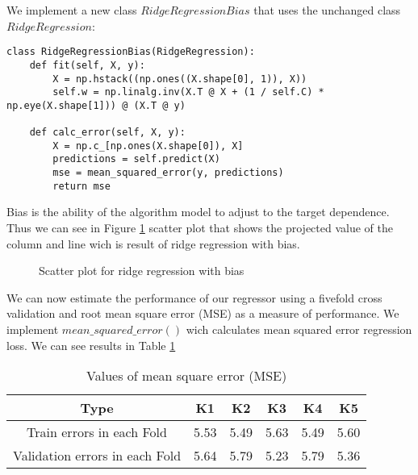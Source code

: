 \documentclass[a4paper, twoside, english]{article}
\begin{document}
\newpage
We implement a new class $RidgeRegressionBias$ that uses the unchanged class $RidgeRegression$:\\
\begin{lstlisting}[language=iPython]
class RidgeRegressionBias(RidgeRegression):
	def fit(self, X, y):
		X = np.hstack((np.ones((X.shape[0], 1)), X))
		self.w = np.linalg.inv(X.T @ X + (1 / self.C) * np.eye(X.shape[1])) @ (X.T @ y)
	
	def calc_error(self, X, y):
		X = np.c_[np.ones(X.shape[0]), X]
		predictions = self.predict(X)
		mse = mean_squared_error(y, predictions)
		return mse
\end{lstlisting}
Bias is the ability of the algorithm model to adjust to the target dependence.\\
Thus we can see in Figure \ref{fig:scatter_b} scatter plot that shows the projected value of the column and line wich is result of ridge regression with bias.\\
 \begin{figure}[h!]
	\centerline
	{
		\qquad
		\qquad
	}
	\caption[scatter]{Scatter plot for ridge regression with bias}
	\label{fig:scatter_b}
\end{figure}


We can now estimate the performance of our regressor using a fivefold cross validation and root mean square error (MSE) as a measure of performance. We implement $mean\_squared\_error()$ wich calculates mean squared error regression loss. We can see results in Table \ref{table:1}
\begin{center}
	\begin{table}[h!]
		\centering
		\begin{tabular}{||c c c c c c||} 
			\hline
			Type & K1 & K2 & K3 & K4 & K5 \\ [0.5ex] 
			\hline\hline
			Train errors in each Fold & 5.53 & 5.49 & 5.63 & 5.49 & 5.60 \\ 
			\hline
			Validation errors in each Fold & 5.64 & 5.79 & 5.23 & 5.79 & 5.36 \\ [1ex] 
			\hline
		\end{tabular}
		\caption{Values of mean square error (MSE)}
		\label{table:1}
	\end{table}
\end{center}
\end{document}
